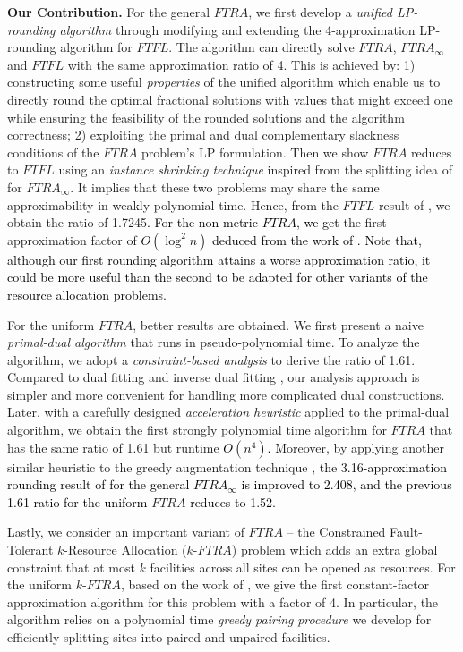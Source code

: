 \documentclass[10pt]{llncs}
\begin{document}
\textbf{Our Contribution.} For the general $FTRA$, we first develop
a \textit{unified LP-rounding algorithm }through modifying and extending
the 4-approximation LP-rounding algorithm \cite{Swamy08FTFL2.076}
for $FTFL$. The algorithm can directly solve $FTRA$, $FTRA_{\infty}$
and $FTFL$ with the same approximation ratio of 4. This is achieved
by: 1) constructing some useful \textit{properties} of the unified
algorithm which enable us to directly round the optimal fractional
solutions with values that might exceed one while ensuring the feasibility
of the rounded solutions and the algorithm correctness; 2) exploiting
the primal and dual complementary slackness conditions of the $FTRA$
problem's LP formulation. Then we show $FTRA$ reduces to $FTFL$
using an \textit{instance shrinking technique} inspired from the splitting
idea of \cite{yan2011newresults} for $FTRA_{\infty}$. It implies
that these two problems may share the same approximability in weakly
polynomial time. Hence, from the $FTFL$ result of \cite{JaroslawFTFL1.725},
we obtain the ratio of 1.7245\textcolor{black}{. For the non-metric
$FTRA$, we get }the first approximation factor of \textcolor{black}{$O\left(\log^{2}n\right)$
deduced from the work of \cite{Jain00FTFL,Lin92filting}. Note that,
although our first rounding algorithm attains a worse approximation
ratio, it could be more useful than the second to be adapted for other
variants of the resource allocation problems.}

For the uniform $FTRA$, better results are obtained. We first present
a naive \textit{primal-dual algorithm} that runs in pseudo-polynomial
time. To analyze the algorithm, we adopt a \textit{constraint-based
analysis} to derive the ratio of 1.61. Compared to dual fitting \cite{Jain03dualfitting}
and inverse dual fitting \cite{shihongftfa}, our analysis approach
is simpler and more convenient for handling more complicated dual
constructions. Later, with a carefully designed \textit{acceleration
heuristic} applied to the primal-dual algorithm, we obtain the first
strongly polynomial time algorithm for $FTRA$ that has the same ratio
of 1.61 but runtime \textcolor{black}{$O\left(n^{4}\right)$. }Moreover,
by applying another similar heuristic to the greedy augmentation technique
\cite{Guha03FTFL2.41}, \textcolor{black}{the 3.16-approximation rounding
result of \cite{yan2011approximation} for the general $FTRA_{\infty}$
is improved to 2.408, and the previous 1.61 ratio for the uniform
}$FTRA$ \textcolor{black}{reduces to 1.52.}

Lastly, we consider an important variant of $FTRA$ -- the Constrained
Fault-Tolerant $k$-Resource Allocation ($k$-$FTRA$) problem which
adds an extra global constraint that at most $k$ facilities across
all sites can be opened as resources. For the uniform $k$-$FTRA$,
based on the work of \cite{jain01approximation,Jain03dualfitting,Swamy08FTFL2.076},
we give the first constant-factor approximation algorithm for this
problem with a factor of 4. In particular, the algorithm relies on
a polynomial time \textit{greedy pairing} \textit{procedure} we develop
for efficiently splitting sites into paired and unpaired facilities.
\end{document}
